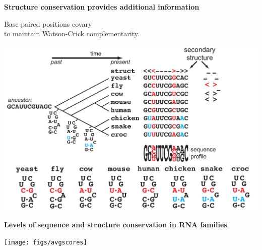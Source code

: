 \documentclass[landscape]{slides}
\begin{document}
\begin{slide}
\begin{center}
\textbf{Structure conservation provides additional information}
\medskip

Base-paired positions covary \\ to maintain Watson-Crick complementarity.

\includegraphics[width=9in]{figs/seqstructprofiles-struct2}
\end{center}

\vfill
\end{slide}
\begin{slide}
\begin{center}
\textbf{Levels of sequence and structure conservation in RNA families}
\end{center}
\medskip

\begin{center}
\texttt{[image: figs/avgscores]}
\end{center}

\vfill

\end{slide}
\end{document}
